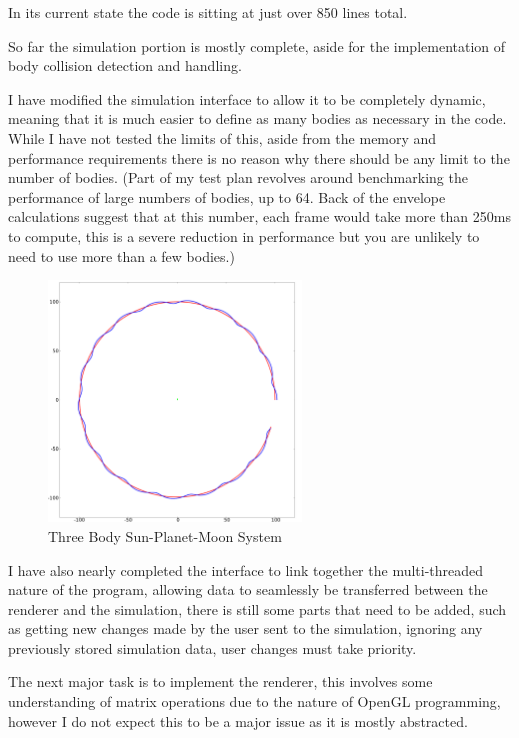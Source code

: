{In its current state the code is sitting at just over 850 lines total.

So far the simulation portion is mostly complete, aside for the implementation of body collision detection and handling.

I have modified the simulation interface to allow it to be completely dynamic, meaning that it is much easier to define as many bodies as necessary in the code. While I have not tested the limits of this, aside from the memory and performance requirements there is no reason why there should be any limit to the number of bodies. (Part of my test plan revolves around benchmarking the performance of large numbers of bodies, up to 64. Back of the envelope calculations suggest that at this number, each frame would take more than 250ms to compute, this is a severe reduction in performance but you are unlikely to need to use more than a few bodies.)

\begin{figure}[H]
  \centering
  \includegraphics[width=0.6\textwidth]{img/still.png}
  \caption{Three Body Sun-Planet-Moon System}
\end{figure}

\pagebreak

I have also nearly completed the interface to link together the multi-threaded nature of the program, allowing data to seamlessly be transferred between the renderer and the simulation, there is still some parts that need to be added, such as getting new changes made by the user sent to the simulation, ignoring any previously stored simulation data, user changes must take priority.

The next major task is to implement the renderer, this involves some understanding of matrix operations due to the nature of OpenGL programming, however I do not expect this to be a major issue as it is mostly abstracted.

}

